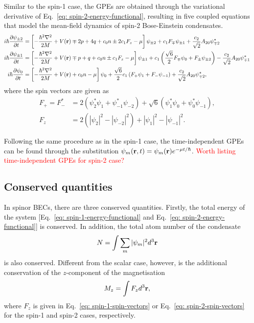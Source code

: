 Similar to the spin-1 case, the GPEs are obtained through the variational
derivative of Eq.~\eqref{eq: spin-2-energy-functional}, resulting in
five coupled equations that model the mean-field dynamics of spin-2
Bose-Einstein condensates.
\begin{align}
    i\hbar\pdv{\psi_{\pm 2}}{t} &= \left[-\frac{\hbar^2\nabla^2}{2M}
    + V(\vb{r}) \mp 2p + 4q + c_0n \pm 2c_1F_z - \mu\right]\psi_{\pm 2}
    + c_1F_{\mp}\psi_{\pm 1} + \frac{c_2}{\sqrt{2}}A_{20}\psi_{\mp 2}^* \\
    i\hbar\pdv{\psi_{\pm 1}}{t} &= \left[-\frac{\hbar^2\nabla^2}{2M}
    + V(\vb{r}) \mp p + q + c_0n \pm c_1F_z - \mu\right]\psi_{\pm 1}
    + c_1\left(\frac{\sqrt{6}}{2}F_{\mp}\psi_0 + F_{\pm}\psi_{\pm 2}\right)
    - \frac{c_2}{\sqrt{2}}A_{20}\psi_{\mp 1}^* \\
    i\hbar\pdv{\psi_0}{t} &= \left[-\frac{\hbar^2\nabla^2}{2M}
    + V(\vb{r}) + c_0n - \mu\right]\psi_0
    + \frac{\sqrt{6}}{2}c_1\left(F_+\psi_1 + F_-\psi_{-1}\right) 
    + \frac{c_2}{\sqrt{2}}A_{20}\psi_{\mp 2}^*,
\end{align}
where the spin vectors are given as
\begin{align}\label{eq: spin-2-spin-vectors}
    F_+ = F_-^* &= 2(\psi_2^*\psi_1 + \psi_{-1}^*\psi_{-2}) 
    + \sqrt{6}(\psi_1^*\psi_0 + \psi_0^*\psi_{-1}), \\
    F_z &= 2(|\psi_2|^2 - |\psi_{-2}|^2) + |\psi_1|^2 - |\psi_{-1}|^2.
\end{align}

Following the same procedure as in the spin-1 case, the time-independent GPEs
can be found through the substitution
\(\psi_m(\vb{r}, t) = \psi_m(\vb{r})e^{-\mu t/\hbar}\).
\textcolor{red}{Worth listing time-independent GPEs for spin-2 case?}

\subsection{Conserved quantities}
In spinor BECs, there are three conserved quantities.
Firstly, the total energy of the system
[Eq.~\eqref{eq: spin-1-energy-functional} and
Eq.~\eqref{eq: spin-2-energy-functional}] is conserved.
In addition, the total atom number of the condensate
\begin{equation}
    N = \int \sum_m |\psi_m|^2 d^3\vb{r}
\end{equation}
is also conserved.
Different from the scalar case, however, is the additional conservation of the
\(z\)-component of the magnetisation
\begin{equation}
    M_z = \int F_z d^3\vb{r},
\end{equation}
where \(F_z\) is given in Eq.~\eqref{eq: spin-1-spin-vectors} or
Eq.~\eqref{eq: spin-2-spin-vectors} for the spin-1 and spin-2 cases,
respectively.
